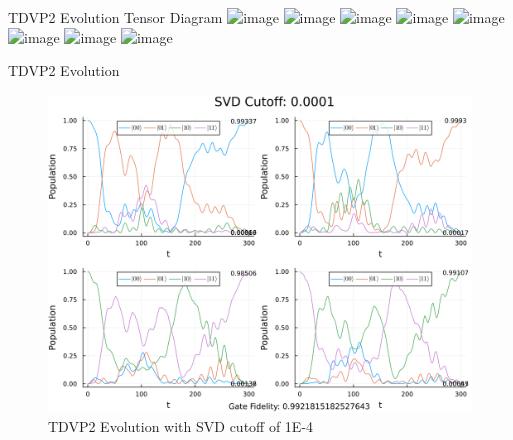 \documentclass{beamer}
\begin{document}
\begin{frame}{TDVP2 Evolution Tensor Diagram}
    \includegraphics<1>[width = 0.95\linewidth]{images/TDVP2 Tensor Diagram/TDVP2_Tensor_1.png}
    \includegraphics<2>[width = 0.95\linewidth]{images/TDVP2 Tensor Diagram/TDVP2_Tensor_2.png}
    \includegraphics<3>[width = 0.95\linewidth]{images/TDVP2 Tensor Diagram/TDVP2_Tensor_3.png}
    \includegraphics<4>[width = 0.95\linewidth]{images/TDVP2 Tensor Diagram/TDVP2_Tensor_4.png}
    \includegraphics<5>[width = 0.95\linewidth]{images/TDVP2 Tensor Diagram/TDVP2_Tensor_5.png}
    \includegraphics<6>[width = 0.95\linewidth]{images/TDVP2 Tensor Diagram/TDVP2_Tensor_6.png}
    \includegraphics<7>[width = 0.95\linewidth]{images/TDVP2 Tensor Diagram/TDVP2_Tensor_7.png}
    \includegraphics<8>[width = 0.95\linewidth]{images/TDVP2 Tensor Diagram/TDVP2_Tensor_8.png}
\end{frame}

\begin{frame}{TDVP2 Evolution}
    \fontsize{10pt}{7.2pt}\selectfont
    \begin{figure}
        \centering
        \includegraphics[width=0.9\linewidth]{images/TDVP2 Tensor Diagram/TDVP2_Evolution.png}
        \caption{TDVP2 Evolution with SVD cutoff of 1E-4}
        \label{fig:TDVP2_Evolution}
    \end{figure}

\end{frame} 
\end{document}
